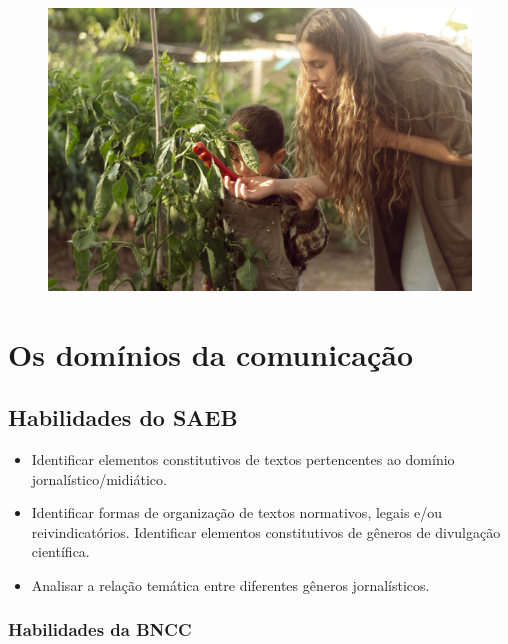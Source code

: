 \begin{figure}[H]
\centering
\includegraphics[width=\textwidth]{./imgSAEB_7_POR/media/image28.png}
\end{figure}

\chapter{Os domínios da comunicação}

\vspace*{-1cm}

\section*{Habilidades do SAEB}

\begin{itemize}

  \item Identificar elementos constitutivos de textos pertencentes ao
domínio jornalístico/midiático.

  \item Identificar formas de organização de textos normativos, legais e/ou
reivindicatórios. Identificar elementos constitutivos de gêneros de
divulgação científica.

  \item Analisar a relação temática entre diferentes gêneros jornalísticos.

\end{itemize}

\subsection{Habilidades da BNCC}

